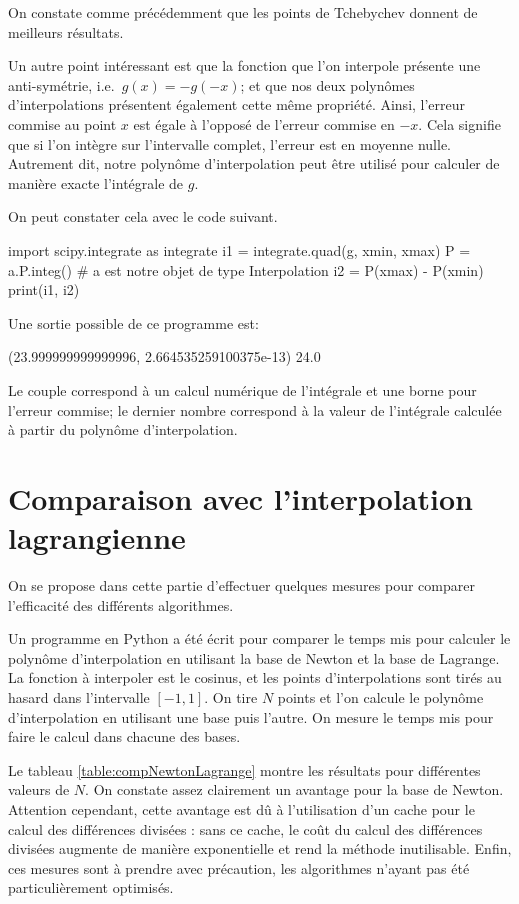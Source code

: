 On constate comme précédemment que les points de Tchebychev 
donnent de meilleurs résultats. 

Un autre point intéressant est que la fonction que l'on 
interpole présente une anti-symétrie, i.e.\ $g(x) = -g(-x)$; 
et que nos deux polynômes d'interpolations présentent également 
cette même propriété. Ainsi, l'erreur commise au point $x$ est 
égale à l'opposé de l'erreur commise en $-x$. Cela signifie que 
si l'on intègre sur l'intervalle complet, l'erreur est en moyenne 
nulle. Autrement dit, notre polynôme d'interpolation peut être 
utilisé pour calculer de manière exacte l'intégrale de $g$.

On peut constater cela avec le code suivant.

\begin{codeblock}
import scipy.integrate as integrate
i1 = integrate.quad(g, xmin, xmax)
P = a.P.integ() # a est notre objet de type Interpolation
i2 = P(xmax) - P(xmin)
print(i1, i2)
\end{codeblock}

Une sortie possible de ce programme est:
\begin{codeblock}
(23.999999999999996, 2.664535259100375e-13) 24.0
\end{codeblock}
Le couple correspond à un calcul numérique de l'intégrale et 
une borne pour l'erreur commise; le dernier nombre correspond 
à la valeur de l'intégrale calculée à partir du polynôme 
d'interpolation.


\section{Comparaison avec l'interpolation lagrangienne}

On se propose dans cette partie d'effectuer quelques mesures 
pour comparer l'efficacité des différents algorithmes.

Un programme en Python a été écrit pour comparer le temps mis 
pour calculer le polynôme d'interpolation en utilisant la 
base de Newton et la base de Lagrange. La fonction à interpoler 
est le cosinus, et les points d'interpolations sont tirés au hasard 
dans l'intervalle $[-1, 1]$. On tire $N$ points et l'on calcule 
le polynôme d'interpolation en utilisant une base puis l'autre. 
On mesure le temps mis pour faire le calcul dans chacune des bases.

Le tableau \ref{table:compNewtonLagrange} montre les résultats 
pour différentes valeurs de $N$. On constate assez clairement 
un avantage pour la base de Newton. 
Attention cependant, cette avantage est dû à l'utilisation d'un 
cache pour le calcul des différences divisées : sans ce cache, 
le coût du calcul des différences divisées augmente de manière 
exponentielle et rend la méthode inutilisable.
Enfin, ces 
mesures sont à prendre avec précaution, les algorithmes n'ayant pas 
été particulièrement optimisés.

